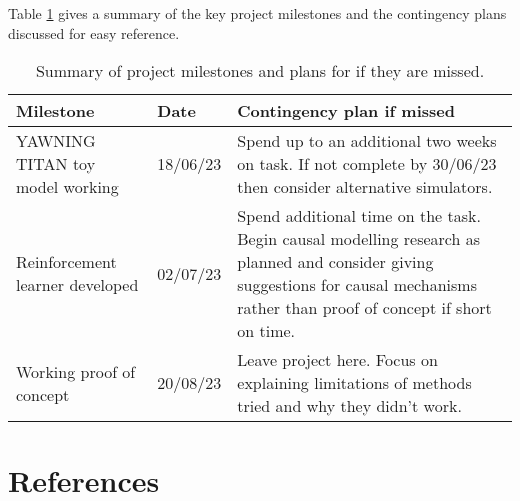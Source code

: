 \documentclass{article}
\begin{document}
Table \ref{tab:comparison} gives a summary of the key project milestones and the contingency plans discussed for easy reference.

\begin{table}[h!]
    \centering
    \small
    \begin{tabular}{ | m{} | m{} |m{} |} 
      \hline
       Milestone & Date & Contingency plan if missed \\ 
      \hline
       YAWNING TITAN toy model working & 18/06/23 & Spend up to an additional two weeks on task. If not complete by 30/06/23 then consider alternative simulators. \\ 
      \hline
       Reinforcement learner developed & 02/07/23 & Spend additional time on the task. Begin causal modelling research as planned and consider giving suggestions for causal mechanisms rather than proof of concept if short on time. \\ 
      \hline
      Working proof of concept & 20/08/23 & Leave project here. Focus on explaining limitations of methods tried and why they didn't work. \\ 
      \hline
      
    \end{tabular}
    \caption{Summary of project milestones and plans for if they are missed.}
    \label{tab:comparison}
\end{table}

\pagebreak



\section{References}

\printbibliography[heading=none, stylename = plain]
\end{document}
